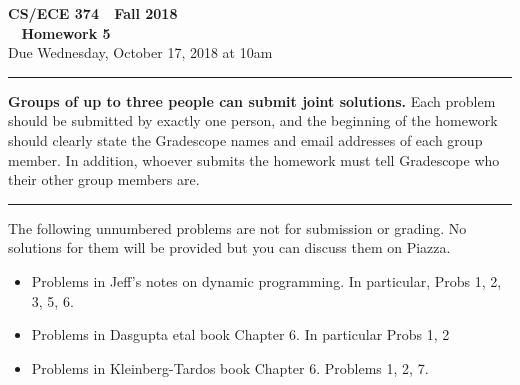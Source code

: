 \documentclass[11pt]{article}
\begin{document}

\thispagestyle{empty}

\begin{center}
\Large\textbf{CS/ECE 374 \,\decosix\,  Fall 2018}%
\\
\LARGE\textbf{\decothreeleft~ Homework 5 ~\decothreeright}%
\\[0.5ex]
\large Due Wednesday, October 17, 2018 at 10am
\end{center}

\bigskip
\hrule
\bigskip

\noindent
\textbf{Groups of up to three people can submit joint solutions.}
Each problem should be submitted by exactly one person, and the
beginning of the homework should clearly state the Gradescope names
and email addresses of each group member.  In addition, whoever
submits the homework must tell Gradescope who their other group
members are.
\bigskip \hrule \bigskip

\noindent
The following unnumbered problems are not for submission or grading.
No solutions for them will be provided but you can discuss them on Piazza.
\begin{itemize}
\item Problems in Jeff's notes on dynamic programming.
In particular, Probs 1, 2, 3, 5, 6.
\item Problems in Dasgupta etal book Chapter 6. In particular Probs 1, 2
\item Problems in Kleinberg-Tardos book Chapter 6. Problems 1, 2, 7.
\end{itemize}

\vspace{1cm}
\end{document}
